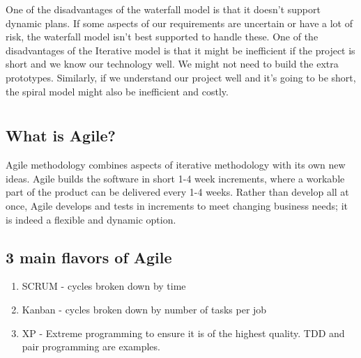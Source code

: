 \documentclass{article}
\begin{document}
One of the disadvantages of the waterfall model is that it doesn't support dynamic plans.  If some aspects of our requirements are uncertain or have a lot of risk, the waterfall model isn't best supported to handle these.  One of the disadvantages of the Iterative model is that it might be inefficient if the project is short and we know our technology well.  We might not need to build the extra prototypes.  Similarly, if we understand our project well and it's going to be short, the spiral model might also be inefficient and costly.
\section{}
\subsection{What is Agile?}
Agile methodology combines aspects of iterative methodology with its own new ideas.  Agile builds the software in short 1-4 week increments, where a workable part of the product can be delivered every 1-4 weeks.  Rather than develop all at once, Agile develops and tests in increments to meet changing business needs; it is indeed a flexible and dynamic option.

\subsection{3 main flavors of Agile}
\begin{enumerate}
    \item SCRUM - cycles broken down by time
    \item Kanban - cycles broken down by number of tasks per job
    \item XP - Extreme programming to ensure it is of the highest quality. TDD and pair programming are examples.
\end{enumerate}
\end{document}
